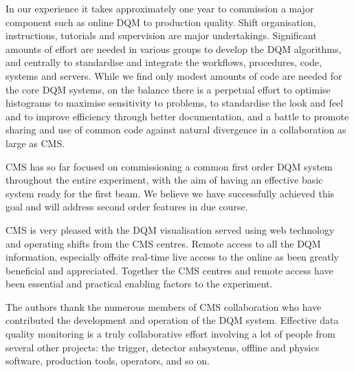 \documentclass[a4paper]{jpconf}
\begin{document}
In our experience it takes approximately one year to commission a major
component such as online DQM to production quality.  Shift organisation,
instructions, tutorials and supervision are major undertakings.  Significant
amounts of effort are needed in various groups to develop the DQM algorithms,
and centrally to standardise and integrate the workflows, procedures, code,
systems and servers.  While we find only modest amounts of code are needed for
the core DQM systems, on the balance there is a perpetual effort to optimise
histograms to maximise sensitivity to problems, to standardise the look and
feel and to improve efficiency through better documentation, and a battle to
promote sharing and use of common code against natural divergence in a
collaboration as large as CMS.

CMS has so far focused on commissioning a common first order DQM system
throughout the entire experiment, with the aim of having an effective basic
system ready for the first beam.  We believe we have successfully achieved
this goal and will address second order features in due course.

CMS is very pleased with the DQM visualisation served using web technology and
operating shifts from the CMS centres.  Remote access to all the DQM
information, especially offsite real-time live access to the online as been
greatly beneficial and appreciated.  Together the CMS centres and remote
access have been essential and practical enabling factors to the experiment.


\ack

The authors thank the numerous members of CMS collaboration who have
contributed the development and operation of the DQM system.  Effective data
quality monitoring is a truly collaborative effort involving a lot of people
from several other projects: the trigger, detector subsystems, offline and
physics software, production tools, operators, and so on.
 
\end{document}
